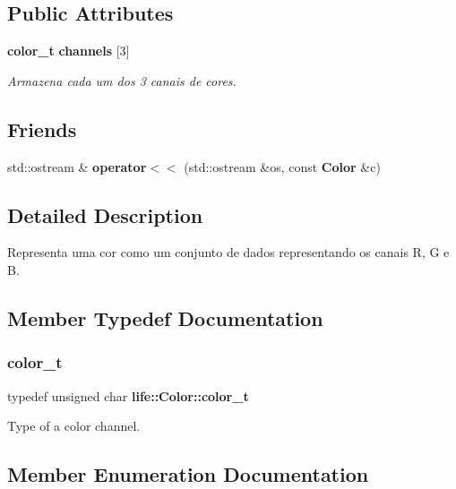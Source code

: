 \subsection*{Public Attributes}
\begin{DoxyCompactItemize}
\item 
\mbox{\label{structlife_1_1_color_acbb18a06aeb0d05c8e9477a25fbd32bf}} 
\textbf{ color\+\_\+t} \textbf{ channels} [3]
\begin{DoxyCompactList}\small\item\em Armazena cada um dos 3 canais de cores. \end{DoxyCompactList}\end{DoxyCompactItemize}
\subsection*{Friends}
\begin{DoxyCompactItemize}
\item 
\mbox{\label{structlife_1_1_color_afdfe1a75bd9930a51707d642a7a4afcd}} 
std\+::ostream \& {\bfseries operator$<$$<$} (std\+::ostream \&os, const \textbf{ Color} \&c)
\end{DoxyCompactItemize}


\subsection{Detailed Description}
Representa uma cor como um conjunto de dados representando os canais R, G e B. 

\subsection{Member Typedef Documentation}
\mbox{\label{structlife_1_1_color_ab392ce7ebd8204f1447c7e296dde9a17}} 
\subsubsection{color\+\_\+t}
{\footnotesize\ttfamily typedef unsigned char \textbf{ life\+::\+Color\+::color\+\_\+t}}

Type of a color channel. 

\subsection{Member Enumeration Documentation}
\mbox{\label{structlife_1_1_color_a56dfdd352118c14f349c4372fd88b251}} 

